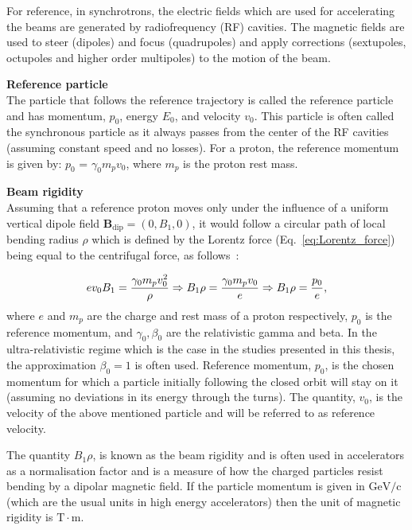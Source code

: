 For reference, in synchrotrons, the electric fields which are used for accelerating the beams are generated by radiofrequency (RF) cavities. The magnetic fields are used to steer (dipoles) and focus (quadrupoles) and apply corrections (sextupoles, octupoles and higher order multipoles) to the motion of the beam. %


\textbf{Reference particle}\\
The particle that follows the reference trajectory is called the reference particle and has momentum, $p_0$, energy $E_0$, and velocity $v_0$.  This particle is often called the synchronous particle as it always passes from the center of the RF cavities (assuming constant speed and no losses). For a proton, the reference momentum is given by: $p_0$ = $\gamma_0 m_p v_0$, where $m_p$ is the proton rest mass.


\textbf{Beam rigidity}\\
Assuming that a reference proton moves only under the influence of a uniform vertical dipole field $\mathbf{B_\mathrm{dip}}=(0, B_1, 0)$, it would follow a circular path of local bending radius $\rho$ which is defined by the Lorentz force (Eq.~\eqref{eq:Lorentz_force}) being equal to the centrifugal force, as follows~\cite{wolski2014}: %

\begin{equation}\label{eq:Brho}
    e v_0 B_1 = \frac{{\gamma_0} m_p v_0^2}{\rho} \Rightarrow B_1 \rho = \frac{\gamma_0 m_p v_0}{e} \Rightarrow B_1 \rho = \frac{p_0}{e},
\end{equation}
where $e$ and $m_p$ are the charge and rest mass of a proton respectively, $p_0$ is the reference momentum, and $\gamma_0, \beta_0$ are the relativistic gamma and beta. In the ultra-relativistic regime which is the case in the studies presented in this thesis, the approximation $\beta_0=1$ is often used.  Reference momentum, $p_0$, is the chosen momentum for which a particle initially following the closed orbit will stay on it (assuming no deviations in its energy through the turns). The quantity, $v_0$, is the velocity of the above mentioned particle and will be referred to as reference velocity.

The quantity $B_1 \rho$, is known as the beam rigidity and is often used in accelerators as a normalisation factor and is a measure of how the charged particles resist bending by a dipolar magnetic field. If the particle momentum is given in $\mathrm{GeV /c}$ (which are the usual units in high energy accelerators) then the unit of magnetic rigidity is $\mathrm{T \cdot m}$.

